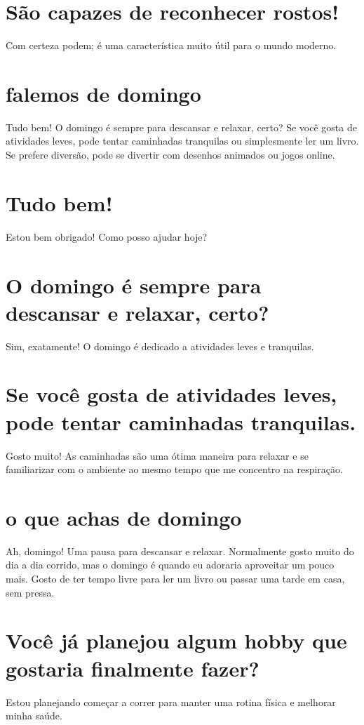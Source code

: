 \documentclass[11pt,a4paper]{article}
\begin{document}
\section{São capazes de reconhecer rostos!}
Com certeza podem; é uma característica muito útil para o mundo moderno.

\section{falemos de domingo}
Tudo bem! O domingo é sempre para descansar e relaxar, certo? Se você gosta de atividades leves, pode tentar caminhadas tranquilas ou simplesmente ler um livro. Se prefere diversão, pode se divertir com desenhos animados ou jogos online.

\section{Tudo bem!}
Estou bem obrigado! Como posso ajudar hoje?

\section{O domingo é sempre para descansar e relaxar, certo?}
Sim, exatamente! O domingo é dedicado a atividades leves e tranquilas.

\section{Se você gosta de atividades leves, pode tentar caminhadas tranquilas.}
Gosto muito! As caminhadas são uma ótima maneira para relaxar e se familiarizar com o ambiente ao mesmo tempo que me concentro na respiração.

\section{o que achas de domingo}
Ah, domingo! Uma pausa para descansar e relaxar. Normalmente gosto muito do dia a dia corrido, mas o domingo é quando eu adoraria aproveitar um pouco mais. Gosto de ter tempo livre para ler um livro ou passar uma tarde em casa, sem pressa.

\section{Você já planejou algum hobby que gostaria finalmente fazer?}
Estou planejando começar a correr para manter uma rotina física e melhorar minha saúde.
\end{document}
